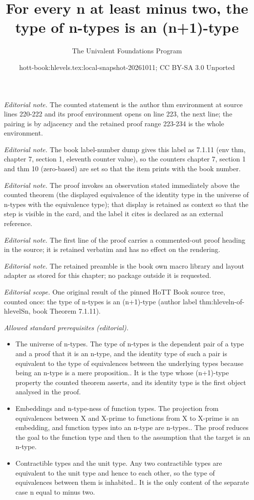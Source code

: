\documentclass[10pt,a4paper]{article}
\title{For every n at least minus two, the type of n-types is an (n+1)-type}
\author{The Univalent Foundations Program}
\date{hott-book:hlevels.tex:local-snapshot-20261011; CC BY-SA 3.0 Unported}
\newcounter{chapter}
\theoremstyle{definition}
\theoremstyle{remark}
\numberwithin{equation}{section}
\begin{document}
\maketitle
\setcounter{chapter}{7}
\setcounter{section}{1}
\setcounter{thm}{10}
\noindent\textit{Editorial note.} The counted statement is the author thm environment at source lines 220-222 and its proof environment opens on line 223, the next line; the pairing is by adjacency and the retained proof range 223-234 is the whole environment.\par\medskip
\noindent\textit{Editorial note.} The book label-number dump gives this label as 7.1.11 (env thm, chapter 7, section 1, eleventh counter value), so the counters chapter 7, section 1 and thm 10 (zero-based) are set so that the item prints with the book number.\par\medskip
\noindent\textit{Editorial note.} The proof invokes an observation stated immediately above the counted theorem (the displayed equivalence of the identity type in the universe of n-types with the equivalence type); that display is retained as context so that the step is visible in the card, and the label it cites is declared as an external reference.\par\medskip
\noindent\textit{Editorial note.} The first line of the proof carries a commented-out proof heading in the source; it is retained verbatim and has no effect on the rendering.\par\medskip
\noindent\textit{Editorial note.} The retained preamble is the book own macro library and layout adapter as stored for this chapter; no package outside it is requested.\par\medskip
\noindent\textit{Editorial scope.} One original result of the pinned HoTT Book source tree, counted once: the type of n-types is an (n+1)-type (author label thm:hleveln-of-hlevelSn, book Theorem 7.1.11).\par\medskip
\noindent\textit{Allowed standard prerequisites (editorial).}\begin{itemize}
\item The universe of n-types. The type of n-types is the dependent pair of a type and a proof that it is an n-type, and the identity type of such a pair is equivalent to the type of equivalences between the underlying types because being an n-type is a mere proposition.. It is the type whose (n+1)-type property the counted theorem asserts, and its identity type is the first object analysed in the proof.
\item Embeddings and n-type-ness of function types. The projection from equivalences between X and X-prime to functions from X to X-prime is an embedding, and function types into an n-type are n-types.. The proof reduces the goal to the function type and then to the assumption that the target is an n-type.
\item Contractible types and the unit type. Any two contractible types are equivalent to the unit type and hence to each other, so the type of equivalences between them is inhabited.. It is the only content of the separate case n equal to minus two.
\end{itemize}\medskip
\end{document}
